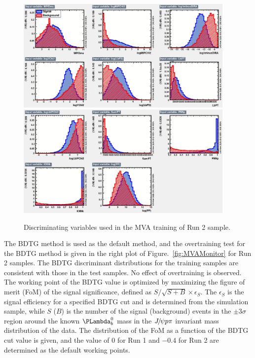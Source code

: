 \begin{figure}[!tbh]
\centering
\begin{minipage}[t]{1.0\textwidth}
\centering
\includegraphics[width=0.95\textwidth]{Figures/08_JpsipK/mva_plots/variables_id_c1.eps} \\
\includegraphics[width=0.95\textwidth]{Figures/08_JpsipK/mva_plots/variables_id_c2.eps}
\end{minipage}
\caption{Discriminating variables used in the MVA training of Run 2 sample.}
\label{fig:MVAvairables}
\end{figure}

The BDTG method is used as the default method,
and the overtraining test for the BDTG method is given in the right plot of Figure.~\ref{fig:MVAMonitor} for Run 2 samples.
The BDTG discriminant distributions for the training samples are consistent with those in the test samples.
No effect of overtraining is observed.
The working point of the BDTG value is optimized by maximizing the figure of merit (FoM) of the signal significance,
defined as $S/\sqrt{S+B}\times\epsilon_{S}$.
The $\epsilon_S$ is the signal efficiency for a specified BDTG cut and is determined from the simulation sample,
while $S$ ($B$) is the number of the signal (background) events in the $\pm3\sigma$ region around the known $\Lb$ mass
in the ${{J\mskip -3mu/\mskip -2mu\psi}}{p}\pi$ invariant mass distribution of the data.
The distribution of the FoM as a function of the BDTG cut value is given,
and the value of $0$ for Run 1 and $-0.4$ for Run 2 are determined as the default working points.


